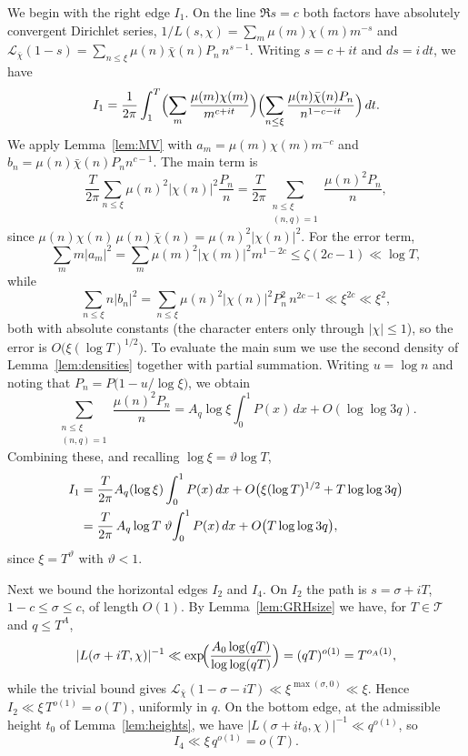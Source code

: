 \documentclass[12pt,a4paper,reqno]{amsart}
\theoremstyle{remark}
\numberwithin{equation}{section}
\begin{document}
We begin with the right edge $I_1$. On the line $\Re s=c$ both factors have absolutely convergent Dirichlet series, $1/L(s,\chi)=\sum_{m}\mu(m)\chi(m)m^{-s}$ and $\mathcal{L}_{\bar\chi}(1-s)=\sum_{n\le\xi}\mu(n)\bar\chi(n)P_n\,n^{s-1}$. Writing $s=c+it$ and $ds=i\,dt$, we have
\[
I_1=\frac{1}{2\pi}\int_1^T\Bigl(\sum_{m}\frac{\mu(m)\chi(m)}{m^{c+it}}\Bigr)\Bigl(\sum_{n\le\xi}\frac{\mu(n)\bar\chi(n)P_n}{n^{1-c-it}}\Bigr)\,dt.
\]
We apply Lemma~\ref{lem:MV} with $a_m=\mu(m)\chi(m)m^{-c}$ and $b_n=\mu(n)\bar\chi(n)P_n n^{c-1}$. The main term is
\[
\frac{T}{2\pi}\sum_{n\le\xi}\mu(n)^2|\chi(n)|^2\frac{P_n}{n}=\frac{T}{2\pi}\sum_{\substack{n\le\xi\\(n,q)=1}}\frac{\mu(n)^2P_n}{n},
\]
since $\mu(n)\chi(n)\,\mu(n)\bar\chi(n)=\mu(n)^2|\chi(n)|^2$. For the error term,
\[
\sum_m m|a_m|^2=\sum_m\mu(m)^2|\chi(m)|^2m^{1-2c}\le\zeta(2c-1)\ll\log T,
\]
while
\[
\sum_{n\le\xi}n|b_n|^2=\sum_{n\le\xi}\mu(n)^2|\chi(n)|^2P_n^2\,n^{2c-1}\ll\xi^{2c}\ll\xi^2 ,
\]
both with absolute constants (the character enters only through $|\chi|\le1$), so the error is $O\bigl(\xi(\log T)^{1/2}\bigr)$. To evaluate the main sum we use the second density of Lemma~\ref{lem:densities} together with partial summation. Writing $u=\log n$ and noting that $P_n=P\bigl(1-u/\log\xi\bigr)$, we obtain
\[
\sum_{\substack{n\le\xi\\(n,q)=1}}\frac{\mu(n)^2P_n}{n}=A_q\log\xi\int_0^1 P(x)\,dx+O(\log\log 3q).
\]
Combining these, and recalling $\log\xi=\vartheta\log T$,
\begin{align}
I_1&=\frac{T}{2\pi}A_q(\log\xi)\int_0^1 P(x)\,dx+O\bigl(\xi(\log T)^{1/2}+T\log\log 3q\bigr)\notag\\
&=\frac{T}{2\pi}\,A_q\log T\;\vartheta\!\int_0^1 P(x)\,dx+O\bigl(T\log\log 3q\bigr),\label{eq:I1-MN}
\end{align}
since $\xi=T^{\vartheta}$ with $\vartheta<1$.

Next we bound the horizontal edges $I_2$ and $I_4$. On $I_2$ the path is $s=\sigma+iT$, $1-c\le\sigma\le c$, of length $O(1)$. By Lemma~\ref{lem:GRHsize} we have, for $T\in\mathcal T$ and $q\le T^{A}$,
\[
|L(\sigma+iT,\chi)|^{-1}\ll\exp\!\Bigl(\frac{A_0\log(qT)}{\log\log(qT)}\Bigr)=(qT)^{o(1)}=T^{o_A(1)},
\]
while the trivial bound gives $\mathcal{L}_{\bar\chi}(1-\sigma-iT)\ll\xi^{\max(\sigma,0)}\ll\xi$. Hence $I_2\ll\xi\,T^{o(1)}=o(T)$, uniformly in $q$. On the bottom edge, at the admissible height $t_0$ of Lemma~\ref{lem:heights}, we have $|L(\sigma+it_0,\chi)|^{-1}\ll q^{o(1)}$, so
\[
I_4\ll\xi\,q^{o(1)}=o(T).
\]
\end{document}
